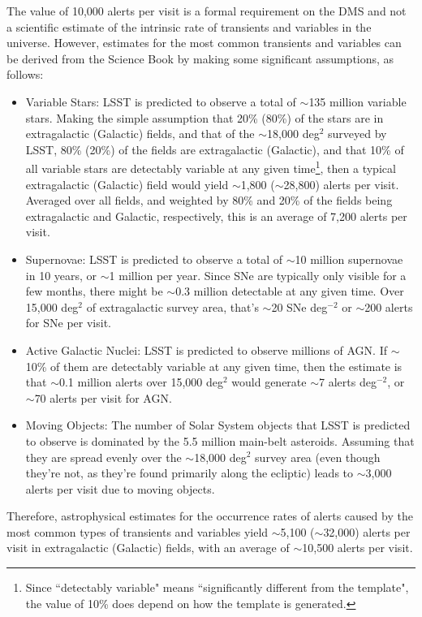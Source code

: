 \documentclass[DM,lsstdraft,authoryear,toc]{lsstdoc}
\begin{document}
The value of 10,000 alerts per visit is a formal requirement on the DMS and not a scientific estimate of the intrinsic rate of transients and variables in the universe. However, estimates for the most common transients and variables can be derived from the Science Book \citep{2009arXiv0912.0201L} by making some significant assumptions, as follows:
\begin{itemize}
\item Variable Stars: LSST is predicted to observe a total of $\sim$135 million variable stars. Making the simple assumption that 20\% (80\%) of the stars are in extragalactic (Galactic) fields, and that of the $\sim$18,000 deg$^2$ surveyed by LSST, 80\% (20\%) of the fields are extragalactic (Galactic), and that 10\% of all variable stars are detectably variable at any given time\footnote{Since ``detectably variable" means ``significantly different from the template", the value of 10\% does depend on how the template is generated.}, then a typical extragalactic (Galactic) field would yield $\sim$1,800 ($\sim$28,800) alerts per visit. Averaged over all fields, and weighted by 80\% and 20\% of the fields being extragalactic and Galactic, respectively, this is an average of 7,200 alerts per visit.
\item Supernovae: LSST is predicted to observe a total of $\sim$10 million supernovae in 10 years, or $\sim$1 million per year. Since SNe are typically only visible for a few months, there might be $\sim$0.3 million detectable at any given time. Over 15,000 deg$^{2}$ of extragalactic survey area, that's $\sim$20 SNe deg$^{-2}$ or $\sim$200 alerts for SNe per visit.
\item Active Galactic Nuclei: LSST is predicted to observe millions of AGN. If $\sim$10\% of them are detectably variable at any given time, then the estimate is that $\sim$0.1 million alerts over 15,000 deg$^2$ would generate $\sim$7 alerts deg$^{-2}$, or $\sim$70 alerts per visit for AGN.
\item Moving Objects: The number of Solar System objects that LSST is predicted to observe is dominated by the 5.5 million main-belt asteroids. Assuming that they are spread evenly over the $\sim$18,000 deg$^2$ survey area (even though they're not, as they're found primarily along the ecliptic) leads to $\sim$3,000 alerts per visit due to moving objects.
\end{itemize} 
Therefore, astrophysical estimates for the occurrence rates of alerts caused by the most common types of transients and variables yield $\sim$5,100 ($\sim$32,000) alerts per visit in extragalactic (Galactic) fields, with an average of $\sim$10,500 alerts per visit.
\end{document}

